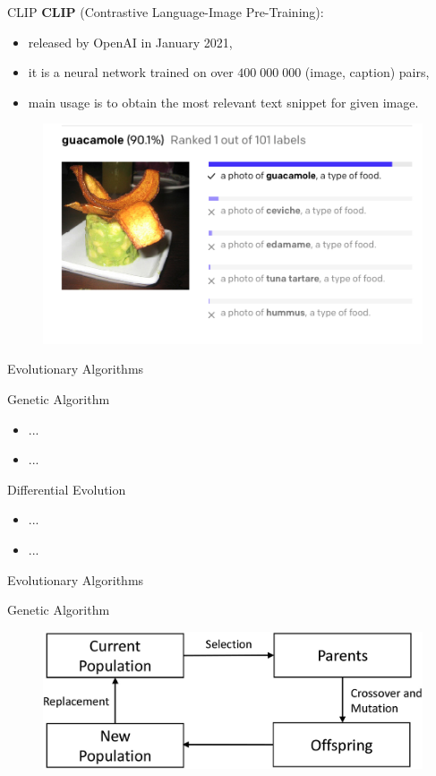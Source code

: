 \documentclass[t]{beamer}
\begin{document}
\begin{frame}{CLIP}
\textbf{CLIP} (Contrastive Language-Image Pre-Training):
\begin{itemize}
\item released by OpenAI in January 2021,
\item it is a neural network trained on over $400 \; 000 \; 000$ (image, caption) pairs,
\item main usage is to obtain the most relevant text snippet for given image.
\end{itemize}
\begin{figure}[ht!]
    \centering
    \includegraphics[scale=0.3]{clip_example.png}
\end{figure} 
\end{frame}

\begin{frame}[c]{Evolutionary Algorithms}
\begin{block}{Genetic Algorithm}
\begin{itemize}
\item ...
\item ...
\end{itemize}
\end{block}
\begin{block}{Differential Evolution}
\begin{itemize}
\item ...
\item ...
\end{itemize}
\end{block}
\end{frame}

\begin{frame}[c]{Evolutionary Algorithms}
\begin{block}{Genetic Algorithm}
\begin{figure}[ht!]
    \centering
    \includegraphics[scale=0.9]{gen-algo.jpg}
\end{figure} 
\end{block}
\end{frame}
\end{document}
